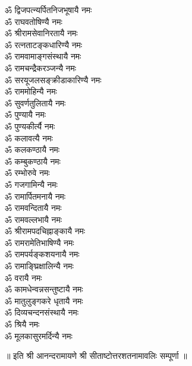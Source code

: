 \begin{multicols}{2}
\begin{flushleft}
ॐ द्विजपत्न्यर्पितनिजभूषायै नमः\\
ॐ राघवतोषिण्यै नमः\\
ॐ श्रीरामसेवानिरतायै नमः\\
ॐ रत्नताटङ्कधारिण्यै नमः\\
ॐ रामवामाङ्गसंस्थायै नमः\\
ॐ रामचन्द्रैकरञ्जन्यै नमः\\
ॐ सरयूजलसङ्क्रीडाकारिण्यै नमः\\
ॐ राममोहिन्यै नमः\hfill{}\\
ॐ सुवर्णतुलितायै नमः\\
ॐ पुण्यायै नमः\\
ॐ पुण्यकीर्त्यै नमः\\
ॐ कलावत्यै नमः\\
ॐ कलकण्ठायै नमः\\
ॐ कम्बुकण्ठायै नमः\\
ॐ रम्भोरुवे नमः\\
ॐ गजगामिन्यै नमः\\
ॐ रामार्पितमनायै नमः\\
ॐ रामवन्दितायै नमः\hfill{}\\
ॐ रामवल्लभायै नमः\\
ॐ श्रीरामपदचिह्नाङ्कायै नमः\\
ॐ रामरामेतिभाषिण्यै नमः\\
ॐ रामपर्यङ्कशयनायै नमः\\
ॐ रामाङ्घ्रिक्षालिन्यै नमः\\
ॐ वरायै नमः\\
ॐ कामधेन्वन्नसन्तुष्टायै नमः\\
ॐ मातुलुङ्गकरे धृतायै नमः\\
ॐ दिव्यचन्दनसंस्थायै नमः\\
ॐ श्रियै नमः\hfill{}\\
ॐ मूलकासुरमर्दिन्यै नमः\\
\end{flushleft}
\end{multicols}
\centerline{॥ इति श्री आनन्दरामायणे श्री सीताष्टोत्तरशतनामावलिः सम्पूर्णा ॥}

